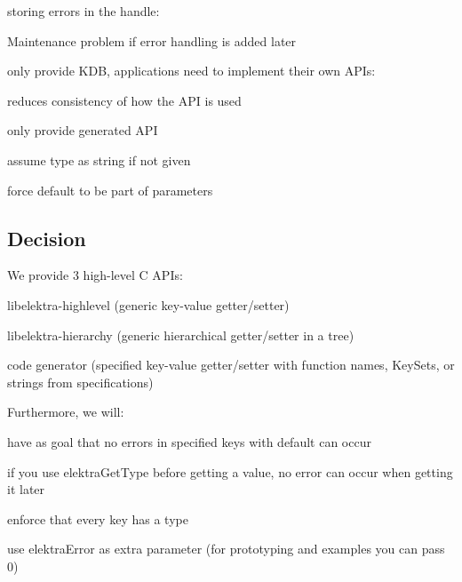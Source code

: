 \begin{DoxyItemize}
\item storing errors in the handle\+:
\begin{DoxyItemize}
\item Maintenance problem if error handling is added later
\end{DoxyItemize}
\item only provide {\ttfamily K\+DB}, applications need to implement their own A\+P\+Is\+:
\begin{DoxyItemize}
\item reduces consistency of how the A\+PI is used
\end{DoxyItemize}
\item only provide generated A\+PI
\item assume type as {\ttfamily string} if not given
\item force {\ttfamily default} to be part of parameters
\end{DoxyItemize}

\subsection*{Decision}

We provide 3 high-\/level C A\+P\+Is\+:


\begin{DoxyEnumerate}
\item libelektra-\/highlevel (generic key-\/value getter/setter)
\item libelektra-\/hierarchy (generic hierarchical getter/setter in a tree)
\item code generator (specified key-\/value getter/setter with function names, Key\+Sets, or strings from specifications)
\end{DoxyEnumerate}

Furthermore, we will\+:


\begin{DoxyItemize}
\item have as goal that no errors in specified keys with default can occur
\item if you use {\ttfamily elektra\+Get\+Type} before getting a value, no error can occur when getting it later
\item enforce that every key has a type
\item use {\ttfamily elektra\+Error} as extra parameter (for prototyping and examples you can pass 0)
\end{DoxyItemize}

